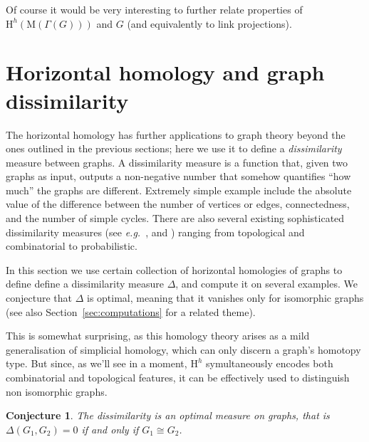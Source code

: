 \documentclass[11pt, a4paper, reqno, twoside, makeidx]{amsart}
\theoremstyle{remark}
\theoremstyle{plain}
\newtheorem{conj}[thm]{Conjecture}
\theoremstyle{definition}
\newcommand{\HH}{\mathrm{H}}
\newcommand{\Mat}{\mathrm{M}}
\begin{document}
Of course it would be very interesting to further relate properties of $\HH^h(\Mat(\Gamma(G)))$ and $G$ (and equivalently to link projections).










































\section{Horizontal homology and graph dissimilarity}\label{sec:graphdiss}

The horizontal homology has further applications to graph theory beyond the ones outlined in the previous sections; here we use it to define a \emph{dissimilarity} measure between graphs. A dissimilarity measure is a function that, given two graphs as input, outputs a non-negative number that somehow quantifies ``how much'' the graphs are different. Extremely simple example include the absolute value of the difference between the number of vertices or edges, connectedness, and the number of simple cycles. 
There are also several existing sophisticated dissimilarity measures (see \emph{e.g.}~\cite{schieber2017quantification},\cite{chartrand1998graph} and \cite{li2018efficient})  ranging from topological and combinatorial to probabilistic. 

In this section we use certain collection of  horizontal homologies of graphs to define define a dissimilarity measure $\Delta$, and compute it on several examples. We  conjecture that $\Delta$ is optimal, meaning that it vanishes only for isomorphic graphs (see also Section~\ref{sec:computations} for a related theme).

This is somewhat surprising, as this homology theory arises as a mild generalisation of simplicial homology, which can only discern a graph's homotopy type. But since, as we'll see in a moment, $\HH^h$ symultaneously encodes both combinatorial and topological features, it can be effectively used to distinguish non isomorphic graphs.
\begin{conj}\label{conj:dissimilarity}
The dissimilarity is an optimal measure on graphs, that is $\Delta(G_1,G_2) = 0$ if and only if $G_1 \cong G_2$.
\end{conj}
\end{document}
